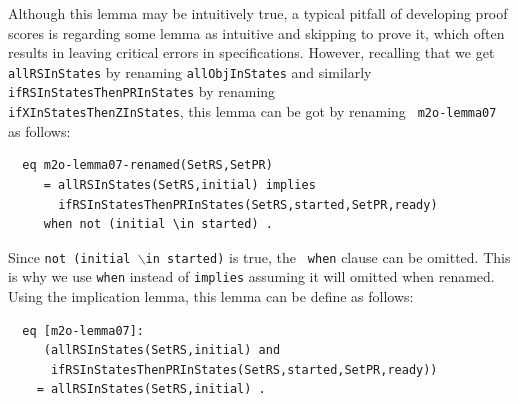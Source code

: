 \documentclass[12pt]{report}
\newcommand{\stt}[1]{{\small{\tt {#1}}}}
\begin{document}
Although this lemma may be intuitively true, a typical pitfall of
developing proof scores is regarding some lemma as intuitive and
skipping to prove it, which often results in leaving critical errors
in specifications. However, recalling that we get {\tt allRSInStates}
by renaming {\tt allObjInStates} and similarly
{\tt ifRSInStatesThenPRInStates} by renaming\\
{\tt ifXInStatesThenZInStates}, this lemma can be got by renaming {\tt
  m2o-lemma07} as follows:
\begin{verbatim}
  eq m2o-lemma07-renamed(SetRS,SetPR)
     = allRSInStates(SetRS,initial) implies 
       ifRSInStatesThenPRInStates(SetRS,started,SetPR,ready)
     when not (initial \in started) .
\end{verbatim}
Since \stt{not (initial $\backslash$in started)} is true, the {\tt
  when} clause can be omitted. This is why we use {\tt when} instead
of {\tt implies} assuming it will omitted when renamed. Using the
implication lemma, this lemma can be define as follows:
\begin{verbatim}
  eq [m2o-lemma07]:
     (allRSInStates(SetRS,initial) and
      ifRSInStatesThenPRInStates(SetRS,started,SetPR,ready))
    = allRSInStates(SetRS,initial) .
\end{verbatim}
\end{document}
